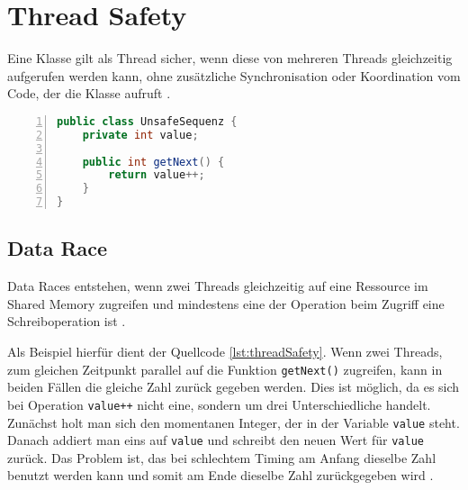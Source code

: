\section{Thread Safety}\label{sec:threadSafety}

Eine Klasse gilt als Thread sicher, wenn diese von mehreren Threads gleichzeitig aufgerufen werden kann, ohne zusätzliche Synchronisation oder Koordination vom Code, der die Klasse aufruft \cite[vgl.][12]{brian}.

\begin{lstlisting}[language=Java,frame=tb,caption={Non-thread-safe Sequence Generator \cite{brian}}, label={lst:threadSafety}, numbers=left, stepnumber=1, captionpos=b]
public class UnsafeSequenz {
	private int value;

	public int getNext() {
		return value++;
	}
}
\end{lstlisting}

\subsection*{Data Race}

Data Races entstehen, wenn zwei Threads gleichzeitig auf eine Ressource im Shared Memory zugreifen und mindestens eine der Operation beim Zugriff eine Schreiboperation ist \cite[vgl.][72]{banerjee_theory_2006}. 

Als Beispiel hierfür dient der Quellcode \ref{lst:threadSafety}. Wenn zwei Threads, zum gleichen Zeitpunkt parallel auf die Funktion \texttt{getNext()} zugreifen, kann in beiden Fällen die gleiche Zahl zurück gegeben werden. Dies ist möglich, da es sich bei Operation \texttt{value++} nicht eine, sondern um drei Unterschiedliche handelt. Zunächst holt man sich den momentanen Integer, der in der Variable \texttt{value} steht. Danach addiert man eins auf \texttt{value} und schreibt den neuen Wert für \texttt{value} zurück. Das Problem ist, das bei schlechtem Timing am Anfang dieselbe Zahl benutzt werden kann und somit am Ende dieselbe Zahl zurückgegeben wird \cite[vgl.][5]{brian}.

